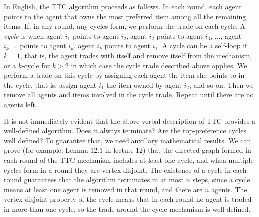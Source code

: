 \documentclass[12pt]{article}
\begin{document}
In English, the TTC algorithm proceeds as follows. In each round, each agent points to the agent that owns the most preferred item among all the remaining items. If, in any round, any cycles form, we perform the trade on each cycle. A \textit{cycle} is when agent $i_1$ points to agent $i_2$, agent $i_2$ points to agent $i_3$, ..., agent $i_{k-1}$ points to agent $i_k$. agent $i_k$ points to agent $i_1$. A cycle can be a self-loop if $k=1$, that is, the agent trades with itself and remove itself from the mechanism, or a $k$-cycle for $k>2$ in which case the cycle trade described above applies. We perform a trade on this cycle by assigning each agent the item she points to in the cycle, that is, assign agent $i_1$ the item owned by agent $i_2$, and so on. Then we remove all agents and items involved in the cycle trade. Repeat until there are no agents left.

It is not immediately evident that the above verbal description of TTC provides a well-defined algorithm. Does it always terminate? Are the top-preference cycles well defined? To guarantee that, we need anxillary mathematical results. We can prove (for example, Lemma 12.1 in lecture 12) that the directed graph formed in each round of the TTC mechanism includes at least one cycle, and when multiple cycles form in a round they are vertex-disjoint. The existence of a cycle in each round guarantees that the algorithm terminates in at most $n$ steps, since a cycle means at least one agent is removed in that round, and there are $n$ agents. The vertex-disjoint property of the cycle means that in each round no agent is traded in more than one cycle, so the trade-around-the-cycle mechanism is well-defined. 
\end{document}
